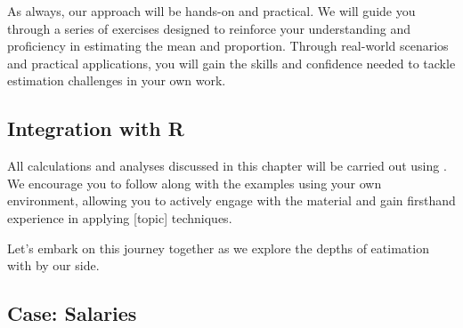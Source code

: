 As always, our approach will be hands-on and practical. We will guide you through a series of exercises designed to reinforce your understanding and proficiency in estimating the mean and proportion. Through real-world scenarios and practical applications, you will gain the skills and confidence needed to tackle estimation challenges in your own work.

\subsection*{Integration with R}

All calculations and analyses discussed in this chapter will be carried out using . We encourage you to follow along with the examples using your own  environment, allowing you to actively engage with the material and gain firsthand experience in applying [topic] techniques.

Let's embark on this journey together as we explore the depths of eatimation with  by our side.

\subsection{Case: Salaries}

